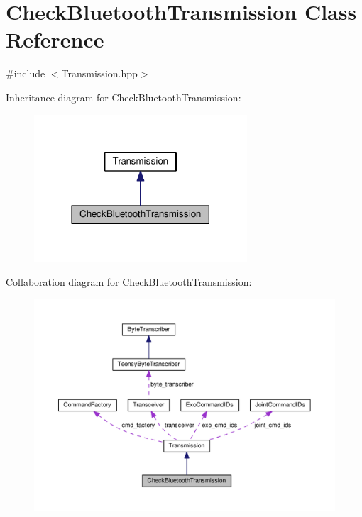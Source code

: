 \hypertarget{classCheckBluetoothTransmission}{}\section{Check\+Bluetooth\+Transmission Class Reference}
\label{classCheckBluetoothTransmission}


{\ttfamily \#include $<$Transmission.\+hpp$>$}



Inheritance diagram for Check\+Bluetooth\+Transmission\+:\nopagebreak
\begin{figure}[H]
\begin{center}
\leavevmode
\includegraphics[width=225pt]{classCheckBluetoothTransmission__inherit__graph}
\end{center}
\end{figure}


Collaboration diagram for Check\+Bluetooth\+Transmission\+:\nopagebreak
\begin{figure}[H]
\begin{center}
\leavevmode
\includegraphics[width=350pt]{classCheckBluetoothTransmission__coll__graph}
\end{center}
\end{figure}
